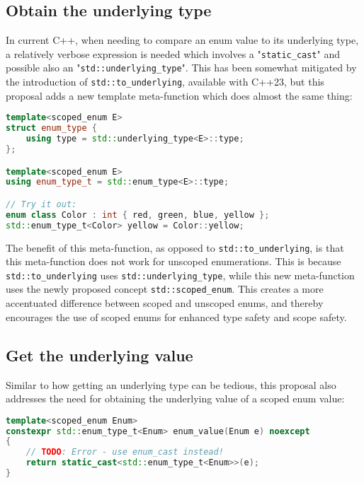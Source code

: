 \documentclass[
  format=manuscript,
  screen=true,
  review=false,
  nonacm=true,
  timestamp=true,
  balance=false]{acmart}
\begin{document}
\subsection{Obtain the underlying type}

In current C++, when needing to compare an enum value to its underlying type,
a relatively verbose expression is needed which involves a "\texttt{static\_cast}"
and possible also an "\texttt{std::underlying\_type}". This has been somewhat
mitigated by the introduction of \texttt{std::to\_underlying}, available with C++23,
but this proposal adds a new template meta-function which does almost the same
thing:\vspace{2mm}

\begin{lstlisting}[language=Cpp]
template<scoped_enum E>
struct enum_type {
    using type = std::underlying_type<E>::type;
};

template<scoped_enum E>
using enum_type_t = std::enum_type<E>::type;

// Try it out:
enum class Color : int { red, green, blue, yellow };
std::enum_type_t<Color> yellow = Color::yellow;
\end{lstlisting}

The benefit of this meta-function, as opposed to \texttt{std::to\_underlying}, is
that this meta-function does not work for unscoped enumerations. This is because
\texttt{std::to\_underlying} uses \texttt{std::underlying\_type}, while this new
meta-function uses the newly proposed concept \texttt{std::scoped\_enum}.
This creates a more accentuated difference between scoped and unscoped enums, and
thereby encourages the use of scoped enums for enhanced type safety and scope
safety.


\subsection{Get the underlying value}

Similar to how getting an underlying type can be tedious, this proposal also
addresses the need for obtaining the underlying value of a scoped enum value:\vspace{2mm}

\begin{lstlisting}[language=Cpp]
template<scoped_enum Enum>
constexpr std::enum_type_t<Enum> enum_value(Enum e) noexcept
{
    // TODO: Error - use enum_cast instead!
    return static_cast<std::enum_type_t<Enum>>(e);
}
\end{lstlisting}
\end{document}
